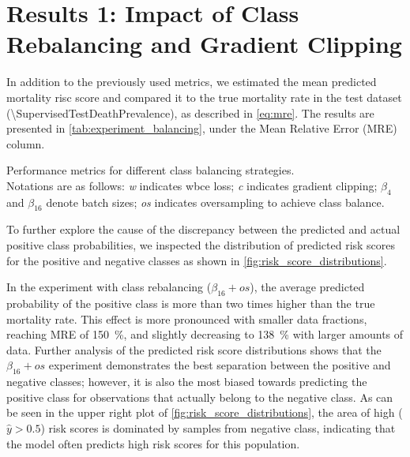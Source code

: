 \section{Results 1: Impact of Class Rebalancing and Gradient Clipping}

In addition to the previously used metrics, we estimated the mean predicted mortality risc score and compared it to the true mortality rate in the test dataset (\num{\SupervisedTestDeathPrevalence}), as described in \cref{eq:mre}. The results are presented in \cref{tab:experiment_balancing}, under the Mean Relative Error (MRE) column.

\begin{table}[h]
    \centering
    
    \caption{Performance metrics for different class balancing strategies. \\
    Notations are as follows: \emph{w} indicates \gls{wbce} loss; \emph{c} indicates gradient clipping; $\beta_{4}$ and $\beta_{16}$ denote batch sizes; \emph{os} indicates oversampling to achieve class balance.
    }
    \label{tab:experiment_balancing}
\end{table}

To further explore the cause of the discrepancy between the predicted and actual positive class probabilities, we inspected the distribution of predicted risk scores for the positive and negative classes as shown in \cref{fig:risk_score_distributions}.

In the experiment with class rebalancing ($\beta_{16}+os$), the average predicted probability of the positive class is more than two times higher than the true mortality rate. This effect is more pronounced with smaller data fractions, reaching MRE of \qty{+150}{\percent}, and slightly decreasing to \qty{+138}{\percent} with larger amounts of data. Further analysis of the predicted risk score distributions shows that the $\beta_{16}+os$ experiment demonstrates the best separation between the positive and negative classes; however, it is also the most biased towards predicting the positive class for observations that actually belong to the negative class. As can be seen in the upper right plot of \cref{fig:risk_score_distributions}, the area of high (\( \hat{y} > 0.5 \)) risk scores is dominated by samples from negative class, indicating that the model often predicts high risk scores for this population.

